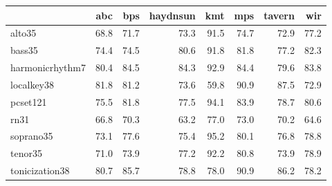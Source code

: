 \begin{tabular}{l|rrrrrrr}
                 & \acrshort{abc}  & \acrshort{bps}  & \acrshort{haydnsun} & \acrshort{kmt} & \acrshort{mps}  & \acrshort{tavern} & \acrshort{wir}  \\ \hline
\gls{alto35}           & 68.8 & 71.7 & 73.3     & 91.5    & 74.7 & 72.9   & 77.2 \\
\gls{bass35}           & 74.4 & 74.5 & 80.6     & 91.8    & 81.8 & 77.2   & 82.3 \\
\gls{harmonicrhythm7}  & 80.4 & 84.5 & 84.3     & 92.9    & 84.4 & 79.6   & 83.8 \\
\gls{localkey38}       & 81.8 & 81.2 & 73.6     & 59.8    & 90.9 & 87.5   & 72.9 \\
\gls{pcset121} & 75.5 & 81.8 & 77.5     & 94.1    & 83.9 & 78.7   & 80.6 \\
\gls{rn31}   & 66.8 & 70.3 & 63.2     & 77.0      & 73.0   & 70.2   & 64.6 \\
\gls{soprano35}        & 73.1 & 77.6 & 75.4     & 95.2    & 80.1 & 76.8   & 78.8 \\
\gls{tenor35}          & 71.0   & 73.9 & 77.2     & 92.2    & 80.8 & 73.9   & 78.9 \\
\gls{tonicization38}   & 80.7 & 85.7 & 78.8     & 78.0      & 90.9 & 86.2   & 78.2
\end{tabular}
